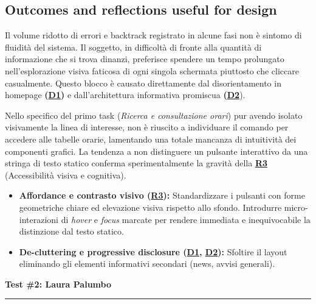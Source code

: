 \documentclass[11pt,a4paper]{article}
\begin{document}
\subsection*{Outcomes and reflections useful for design}
\begin{tcolorbox}[colback=backgroundColor,colframe=borderColor,arc=2mm]
Il volume ridotto di errori e backtrack registrato in alcune fasi non è sintomo di fluidità del sistema. Il soggetto, in difficoltà di fronte alla quantità di informazione che si trova dinanzi, preferisce spendere un tempo prolungato nell'esplorazione visiva faticosa di ogni singola schermata piuttosto che cliccare casualmente. Questo blocco è causato direttamente dal disorientamento in homepage \textbf{(\hyperref[iss:D1]{D1})} e dall'architettura informativa promiscua \textbf{(\hyperref[iss:D2]{D2}}).

Nello specifico del primo task (\textit{Ricerca e consultazione orari}) pur avendo isolato visivamente la linea di interesse, non è riuscito a individuare il comando per accedere alle tabelle orarie, lamentando una totale mancanza di intuitività dei componenti grafici.
La tendenza a non distinguere un pulsante interattivo da una stringa di testo statico conferma sperimentalmente la gravità della \textbf{\hyperref[iss:R3]{R3}} (Accessibilità visiva e cognitiva). 

\begin{itemize}[leftmargin=*]
    \item \textbf{Affordance e contrasto visivo (\hyperref[iss:R3]{R3}):} Standardizzare i pulsanti con forme geometriche chiare ed elevazione visiva rispetto allo sfondo. Introdurre micro-interazioni di \textit{hover} e \textit{focus} marcate per rendere immediata e inequivocabile la distinzione dal testo statico.
    \item \textbf{De-cluttering e progressive disclosure (\hyperref[iss:D1]{D1}, \hyperref[iss:D2]{D2}):} Sfoltire il layout eliminando gli elementi informativi secondari (news, avvisi generali).
\end{itemize}
\end{tcolorbox}


\newpage
\begin{center}
  {\color{primaryColor}\large\bfseries Test \#2: Laura Palumbo}\\
  \vspace{0.1cm}
  \color{borderColor}\hrule
\end{center}
\end{document}
